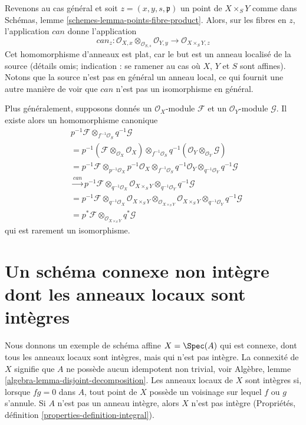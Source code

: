 \medskip\noindent
Revenons au cas général et soit $z = (x, y, s, \mathfrak p)$
un point de $X \times_S Y$ comme dans
Schémas, lemme \ref{schemes-lemma-points-fibre-product}.
Alors, sur les fibres en $z$, l'application $can$ donne l'application
$$
can_z :
\mathcal{O}_{X, x} \otimes_{\mathcal{O}_{S, s}} \mathcal{O}_{Y, y}
\longrightarrow
\mathcal{O}_{X \times_S Y, z}
$$
Cet homomorphisme d'anneaux est plat, car le but est un anneau localisé de la
source (détails omis; indication : se ramener au cas où $X$, $Y$ et $S$
sont affines).
Notons que la source n'est pas en général un anneau local, ce qui fournit
une autre manière de voir que $can$ n'est pas un isomorphisme en général.

\medskip\noindent
Plus généralement, supposons donnés un $\mathcal{O}_X$-module $\mathcal{F}$ et un
$\mathcal{O}_Y$-module $\mathcal{G}$. Il existe alors un homomorphisme canonique
\begin{align*}
& p^{-1}\mathcal{F} \otimes_{f^{-1}\mathcal{O}_S} q^{-1}\mathcal{G} \\
& =
p^{-1}(\mathcal{F} \otimes_{\mathcal{O}_X} \mathcal{O}_X)
\otimes_{f^{-1}\mathcal{O}_S}
q^{-1}(\mathcal{O}_Y \otimes_{\mathcal{O}_Y} \mathcal{G}) \\
& =
p^{-1}\mathcal{F} \otimes_{p^{-1}\mathcal{O}_X} p^{-1}\mathcal{O}_X
\otimes_{f^{-1}\mathcal{O}_S}
q^{-1}\mathcal{O}_Y \otimes_{q^{-1}\mathcal{O}_Y} q^{-1}\mathcal{G} \\
& \xrightarrow{can}
p^{-1}\mathcal{F} \otimes_{q^{-1}\mathcal{O}_X}
\mathcal{O}_{X \times_S Y}
\otimes_{q^{-1}\mathcal{O}_Y} q^{-1}\mathcal{G}  \\
& =
p^{-1}\mathcal{F} \otimes_{q^{-1}\mathcal{O}_X}
\mathcal{O}_{X \times_S Y}
\otimes_{\mathcal{O}_{X \times_S Y}}
\mathcal{O}_{X \times_S Y}
\otimes_{q^{-1}\mathcal{O}_Y} q^{-1}\mathcal{G}  \\
& =
p^*\mathcal{F} \otimes_{\mathcal{O}_{X \times_S Y}} q^*\mathcal{G}
\end{align*}
qui est rarement un isomorphisme.





\section[Schéma connexe non intègre à anneaux locaux intègres]{Un schéma connexe non intègre dont les anneaux locaux sont intègres}
\label{section-connected-locally-integral-not-integral}

\noindent
Nous donnons un exemple de schéma affine $X = \Spec(A)$ qui est
connexe, dont tous les anneaux locaux sont intègres, mais qui n'est pas intègre.
La connexité de $X$ signifie que $A$ ne possède aucun idempotent non trivial, voir
Algèbre, lemme \ref{algebra-lemma-disjoint-decomposition}.
Les anneaux locaux de $X$ sont intègres si, lorsque $fg = 0$ dans $A$, tout
point de $X$ possède un voisinage sur lequel $f$ ou $g$ s'annule.
Si $A$ n'est pas un anneau intègre, alors $X$ n'est pas intègre
(Propriétés, définition \ref{properties-definition-integral}).

